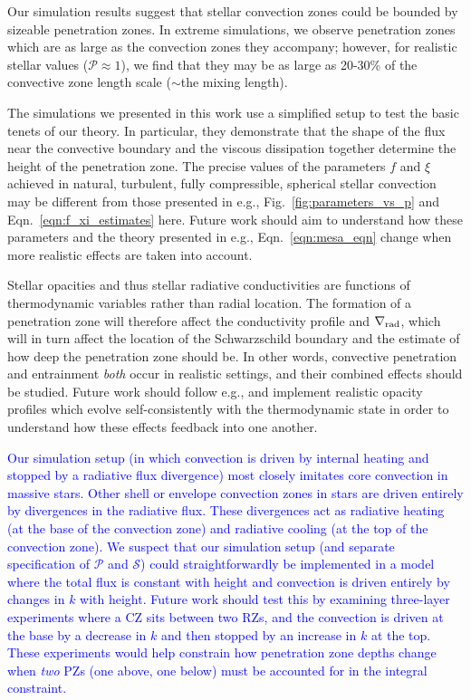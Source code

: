 \documentclass[twocolumn, linenumbers]{aastex631}
\newcommand{\gradrad}{\ensuremath{\nabla_{\rm{rad}}}}
\newcommand{\mP}{\ensuremath{\mathcal{P}}}
\newcommand{\mS}{\ensuremath{\mathcal{S}}}
\newcommand{\edittwo}[1]{\textcolor{blue}{#1}}
\begin{document}
Our simulation results suggest that stellar convection zones could be bounded by sizeable penetration zones.
In extreme simulations, we observe penetration zones which are as large as the convection zones they accompany; however, for realistic stellar values ($\mP \approx 1$), we find that they may be as large as 20-30\% of the convective zone length scale ($\sim$the mixing length).

The simulations we presented in this work use a simplified setup to test the basic tenets of our theory.
In particular, they demonstrate that the shape of the flux near the convective boundary and the viscous dissipation together determine the height of the penetration zone.
The precise values of the parameters $f$ and $\xi$ achieved in natural, turbulent, fully compressible, spherical stellar convection may be different from those presented in e.g., Fig.~\ref{fig:parameters_vs_p} and Eqn.~\ref{eqn:f_xi_estimates} here.
Future work should aim to understand how these parameters and the theory presented in e.g., Eqn.~\ref{eqn:mesa_eqn} change when more realistic effects are taken into account.

Stellar opacities and thus stellar radiative conductivities are functions of thermodynamic variables rather than radial location.
The formation of a penetration zone will therefore affect the conductivity profile and $\gradrad$, which will in turn affect the location of the Schwarzschild boundary and the estimate of how deep the penetration zone should be.
In other words, convective penetration and entrainment \emph{both} occur in realistic settings, and their combined effects should be studied.
Future work should follow e.g., \citet{kapyla_etal_2017} and implement realistic opacity profiles which evolve self-consistently with the thermodynamic state in order to understand how these effects feedback into one another.

\edittwo{
    Our simulation setup (in which convection is driven by internal heating and stopped by a radiative flux divergence) most closely imitates core convection in massive stars.
    Other shell or envelope convection zones in stars are driven entirely by divergences in the radiative flux.
    These divergences act as radiative heating (at the base of the convection zone) and radiative cooling (at the top of the convection zone).
    We suspect that our simulation setup (and separate specification of $\mP$ and $\mS$) could straightforwardly be implemented in a model where the total flux is constant with height and convection is driven entirely by changes in $k$ with height.
    Future work should test this by examining three-layer experiments where a CZ sits between two RZs, and the convection is driven at the base by a decrease in $k$ and then stopped by an increase in $k$ at the top.
    These experiments would help constrain how penetration zone depths change when \emph{two} PZs (one above, one below) must be accounted for in the integral constraint.
}
\end{document}
